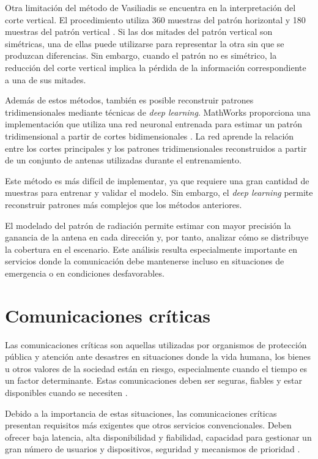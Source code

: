 Otra limitación del método de Vasiliadis se encuentra en la interpretación del corte vertical. El procedimiento utiliza 360 muestras del patrón horizontal y 180 muestras del patrón vertical \cite{vasiliadis2005}. Si las dos mitades del patrón vertical son simétricas, una de ellas puede utilizarse para representar la otra sin que se produzcan diferencias. Sin embargo, cuando el patrón no es simétrico, la reducción del corte vertical implica la pérdida de la información correspondiente a una de sus mitades.

Además de estos métodos, también es posible reconstruir patrones tridimensionales mediante técnicas de \textit{deep learning}. MathWorks proporciona una implementación que utiliza una red neuronal entrenada para estimar un patrón tridimensional a partir de cortes bidimensionales \cite{mathworks_patternfromai}. La red aprende la relación entre los cortes principales y los patrones tridimensionales reconstruidos a partir de un conjunto de antenas utilizadas durante el entrenamiento.

Este método es más difícil de implementar, ya que requiere una gran cantidad de muestras para entrenar y validar el modelo. Sin embargo, el \textit{deep learning} permite reconstruir patrones más complejos que los métodos anteriores.

El modelado del patrón de radiación permite estimar con mayor precisión la ganancia de la antena en cada dirección y, por tanto, analizar cómo se distribuye la cobertura en el escenario. Este análisis resulta especialmente importante en servicios donde la comunicación debe mantenerse incluso en situaciones de emergencia o en condiciones desfavorables.


\section{Comunicaciones críticas}

Las comunicaciones críticas son aquellas utilizadas por organismos de protección pública y atención ante desastres en situaciones donde la vida humana, los bienes u otros valores de la sociedad están en riesgo, especialmente cuando el tiempo es un factor determinante. Estas comunicaciones deben ser seguras, fiables y estar disponibles cuando se necesiten \cite{itur_m2377}.

Debido a la importancia de estas situaciones, las comunicaciones críticas presentan requisitos más exigentes que otros servicios convencionales. Deben ofrecer baja latencia, alta disponibilidad y fiabilidad, capacidad para gestionar un gran número de usuarios y dispositivos, seguridad y mecanismos de prioridad \cite{etsi122280}.

